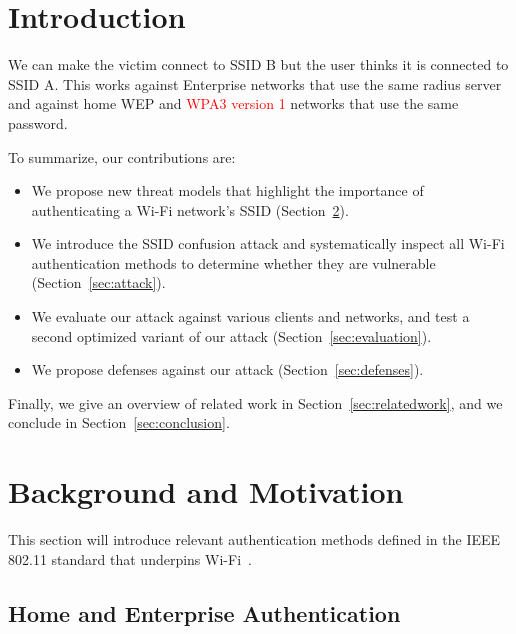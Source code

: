 \documentclass[sigconf,review]{acmart}
\newcommand{\wifi}{\mbox{Wi-Fi}}
\DeclareRobustCommand{\red}[1]{\textcolor{red}{#1}}
\begin{document}
\maketitle

\section{Introduction}

We can make the victim connect to SSID B but the user thinks it is connected to SSID A.
This works against Enterprise networks that use the same radius server and against home WEP and \red{WPA3 version 1} networks that use the same password.

To summarize, our contributions are:
\begin{itemize}
	\item We propose new threat models that highlight the importance of authenticating a \wifi{} network's SSID (Section~\ref{sec:motivation}).

    \item We introduce the SSID confusion attack and systematically inspect all \wifi{} authentication methods to determine whether they are vulnerable (Section~\ref{sec:attack}).

    \item
    We evaluate our attack against various clients and networks, and test a second optimized variant of our attack (Section~\ref{sec:evaluation}).
	
	\item We propose %
	defenses against our attack (Section~\ref{sec:defenses}).
\end{itemize}
Finally, we give an overview of related work in Section~\ref{sec:relatedwork}, and we conclude in Section~\ref{sec:conclusion}.


\section{Background and Motivation}
\label{sec:motivation}

This section will introduce relevant authentication methods defined in the IEEE 802.11 standard that underpins \wifi{}~\cite{ieee80211-2020}.

\subsection{Home and Enterprise Authentication}
\end{document}
